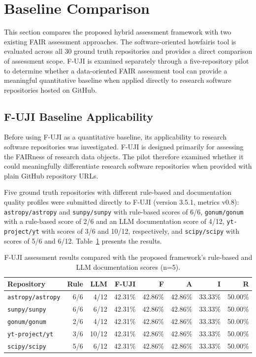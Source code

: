 \section{Baseline Comparison}

This section compares the proposed hybrid assessment framework 
with two existing FAIR assessment approaches. The software-oriented 
howfairis tool is evaluated across all 30 ground truth repositories 
and provides a direct comparison of assessment scope. F-UJI is 
examined separately through a five-repository pilot to determine 
whether a data-oriented FAIR assessment tool can provide a 
meaningful quantitative baseline when applied directly to research 
software repositories hosted on GitHub.

\subsection{F-UJI Baseline Applicability}
\label{sec:fuji_baseline}

Before using F-UJI as a quantitative baseline, its applicability 
to research software repositories was investigated. F-UJI is 
designed primarily for assessing the FAIRness of research data 
objects. The pilot therefore examined whether it could meaningfully 
differentiate research software repositories when provided with 
plain GitHub repository URLs.

Five ground truth repositories with different rule-based and 
documentation quality profiles were submitted directly to F-UJI 
(version 3.5.1, metrics v0.8): \texttt{astropy/astropy} and 
\texttt{sunpy/sunpy} with rule-based scores of 6/6, 
\texttt{gonum/gonum} with a rule-based score of 2/6 and an LLM 
documentation score of 4/12, \texttt{yt-project/yt} with scores 
of 3/6 and 10/12, respectively, and \texttt{scipy/scipy} with 
scores of 5/6 and 6/12. Table~\ref{tab:fuji_pilot} presents the 
results.

\begin{table}[h]
\centering
\caption{F-UJI assessment results compared with the proposed 
framework's rule-based and LLM documentation scores (n=5).}
\label{tab:fuji_pilot}
\begin{tabular}{lrrrrrrr}
\hline
\textbf{Repository} & \textbf{Rule} & \textbf{LLM} & 
\textbf{F-UJI} & \textbf{F} & \textbf{A} & 
\textbf{I} & \textbf{R} \\
\hline
\texttt{astropy/astropy} & 6/6 & 4/12 & 42.31\% & 42.86\% & 42.86\% & 33.33\% & 50.00\% \\
\texttt{sunpy/sunpy}     & 6/6 & 6/12 & 42.31\% & 42.86\% & 42.86\% & 33.33\% & 50.00\% \\
\texttt{gonum/gonum}     & 2/6 & 4/12 & 42.31\% & 42.86\% & 42.86\% & 33.33\% & 50.00\% \\
\texttt{yt-project/yt}   & 3/6 & 10/12 & 42.31\% & 42.86\% & 42.86\% & 33.33\% & 50.00\% \\
\texttt{scipy/scipy}     & 5/6 & 6/12 & 42.31\% & 42.86\% & 42.86\% & 33.33\% & 50.00\% \\
\hline
\end{tabular}
\end{table}

